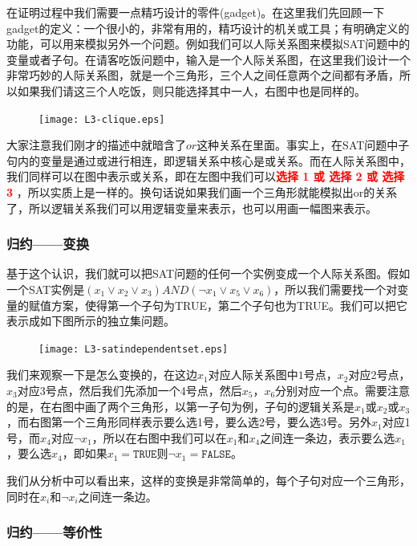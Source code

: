 在证明过程中我们需要一点精巧设计的零件(gadget)。在这里我们先回顾一下gadget的定义：一个很小的，非常有用的，精巧设计的机关或工具；有明确定义的功能，可以用来模拟另外一个问题。例如我们可以人际关系图来模拟SAT问题中的变量或者子句。在请客吃饭问题中，输入是一个人际关系图，在这里我们设计一个非常巧妙的人际关系图，就是一个三角形，三个人之间任意两个之间都有矛盾，所以如果我们请这三个人吃饭，则只能选择其中一人，右图中也是同样的。

\begin{figure}[H]
	\centering
	\texttt{[image: L3-clique.eps]}
\end{figure}

大家注意我们刚才的描述中就暗含了$or$这种关系在里面。事实上，在SAT问题中子句内的变量是通过或进行相连，即逻辑关系中核心是或关系。而在人际关系图中，我们同样可以在图中表示或关系，即在左图中我们可以\textcolor{red}{\bf 选择 1 或 选择 2 或 选择 3} ，所以实质上是一样的。换句话说如果我们画一个三角形就能模拟出or的关系了，所以逻辑关系我们可以用逻辑变量来表示，也可以用画一幅图来表示。

\subsubsection{归约——变换}

基于这个认识，我们就可以把SAT问题的任何一个实例变成一个人际关系图。假如一个SAT实例是$(x_1 \vee x_2 \vee x_3) AND (\neg x_1 \vee x_5 \vee x_6)$，所以我们需要找一个对变量的赋值方案，使得第一个子句为TRUE，第二个子句也为TRUE。我们可以把它表示成如下图所示的独立集问题。

\begin{figure}[H]
\centering
\texttt{[image: L3-satindependentset.eps]}
\end{figure}

我们来观察一下是怎么变换的，在这边$x_1$对应人际关系图中$1$号点，$x_2$对应2号点，$x_3$对应3号点，然后我们先添加一个4号点，然后$x_5$，$x_6$分别对应一个点。需要注意的是，在右图中画了两个三角形，以第一子句为例，子句的逻辑关系是$x_1$或$x_2$或$x_3$，而右图第一个三角形同样表示要么选1号，要么选2号，要么选3号。另外$x_1$对应1号，而$x_4$对应$\neg x_1$，所以在右图中我们可以在$x_1$和$x_4$之间连一条边，表示要么选$x_1$，要么选$x_4$，即如果$x_1 = \texttt{TRUE}$则$\neg x_1 = \texttt{FALSE}$。

我们从分析中可以看出来，这样的变换是非常简单的，每个子句对应一个三角形，同时在$x_i$和$\neg x_i$之间连一条边。

\subsubsection{归约——等价性}

